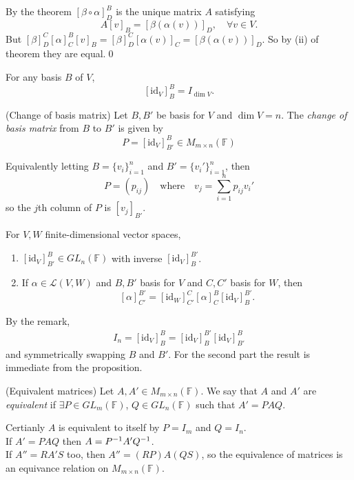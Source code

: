 \documentclass{article}
\newcommand{\F}{\mathbb{F}}
\begin{document}
\pf By the theorem $ [\beta\circ\alpha]^B_D $ is the unique matrix $ A $ satisfying
\[
	A[v]_B=[\beta(\alpha(v))]_D,\quad \forall v\in V.
\]
But $ [\beta]^C_D[\alpha]^B_C[v]_B=[\beta]^C_D[\alpha(v)]_C=[\beta(\alpha(v))]_D $. So by (ii) of theorem they are equal.\qed
\begin{remark}
  For any basis $ B $ of $ V $,
  \[
	  [\mathrm{id}_V]^B_B=I_{\dim V}.
  \]
\end{remark}
\begin{definition}
	(Change of basis matrix) Let $ B,B' $ be basis for $ V $ and $ \dim V=n $. The \textit{change of basis matrix} from $ B $ to $ B' $ is given by
	\[
		P=[\mathrm{id}_V]^B_{B'}\in M_{m\times n}(\F)
	\]
\end{definition}
Equivalently letting $ B=\{v_i\}_{i=1}^n $ and $ B'=\{v_i'\}_{i=1}^n $, then
\[
	P=(p_{ij})\quad\text{where}\quad v_j=\sum_{i=1}^n p_{ij}v_i'
\]
so the $ j $th column of $ P $ is $ [v_j]_{B'} $.
\begin{proposition}
	For $ V,W $ finite-dimensional vector spaces,\smallskip
  \begin{enumerate}
	  \item $ [\mathrm{id}_V]^B_{B'}\in GL_n(\F) $ with inverse $ [\mathrm{id}_V]^{B'}_B $.
	  \item If $ \alpha\in\mathcal L(V,W) $ and $ B,B' $ basis for $ V $ and $ C,C' $ basis for $ W $, then
		  \[
			  [\alpha]^{B'}_{C'}=[\mathrm{id}_W]^C_{C'}[\alpha]^B_C[\mathrm{id}_V]^{B'}_B.
		  \]
  \end{enumerate}
\end{proposition}
\pf By the remark,
\begin{align*}
	I_n=[\mathrm{id}_V]^B_B=[\mathrm{id}_V]^{B'}_B[\mathrm{id}_V]^B_{B'}
\end{align*}
and symmetrically swapping $ B $ and $ B' $. For the second part the result is immediate from the proposition.
\begin{definition}
	(Equivalent matrices) Let $ A,A'\in M_{m\times n}(\F) $. We say that $ A $ and $ A' $ are \textit{equivalent} if $ \exists P\in GL_m(\F) $, $ Q\in GL_n(\F) $ such that $ A'=PAQ $. 
\end{definition}
\begin{remark}
  Certianly $ A $ is equivalent to itself by $ P=I_m $ and $ Q=I_n $.\\
  If $ A'=PAQ $ then $ A={P}^{-1}A'{Q}^{-1} $.\\
  If $ A''=RA'S $ too, then $ A''=(RP)A(QS) $, so the equivalence of matrices is an equivance relation on $ M_{m\times n}(\F) $.
\end{remark}
\end{document}
